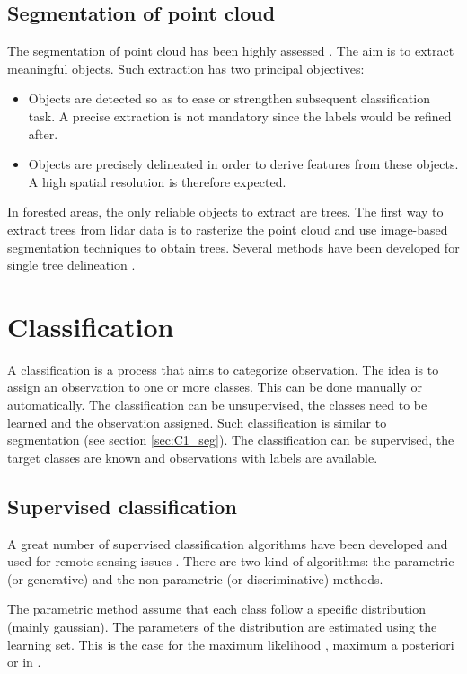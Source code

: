 \subsection{Segmentation of point cloud}
The segmentation of point cloud has been highly assessed \citep{nguyen20133d}. The aim is to extract meaningful objects. Such extraction has two principal objectives:
\begin{itemize}
\item Objects are detected so as to ease or strengthen subsequent classification task. A precise extraction is not mandatory since the labels would be refined after.
\item Objects are precisely delineated in order to derive features from these objects. A high spatial resolution is therefore expected.
\end{itemize}

In forested areas, the only reliable objects to extract are trees. The first way to extract trees from lidar data is to rasterize the point cloud and use image-based segmentation techniques to obtain trees. Several methods have been developed for single tree delineation \citep{dalponte2014tree, vega2014ptrees, kandare2014new}. 

\section{Classification}
A classification is a process that aims to categorize observation. The idea is to assign an observation to one or more classes. This can be done manually or automatically. The classification can be unsupervised, the classes need to be learned and the observation assigned. Such classification is similar to segmentation (see section \ref{sec:C1_seg}). The classification can be supervised, the target classes are known and observations with labels are available.

\subsection{Supervised classification}
A great number of supervised classification algorithms have been developed and used for remote sensing issues \citep{landgrebe2005signal, lu2007survey, mather2016classification}. There are two kind of algorithms: the parametric (or generative) and the non-parametric (or discriminative) methods.

The parametric method assume that each class follow a specific distribution (mainly gaussian). The parameters of the distribution are estimated using the learning set. This is the case for the maximum likelihood \citep{strahler1980use}, maximum a posteriori \citep{fauvel2015fast} or in \cite{trias2005high}.

